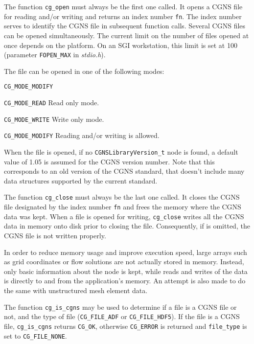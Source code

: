 The function \texttt{cg\_open} must always be the first one called.
It opens a CGNS file for reading and/or writing and returns an index
number \texttt{fn}.
The index number serves to identify the CGNS file in subsequent
function calls.
Several CGNS files can be opened simultaneously.
The current limit on the number of files opened at once depends on the
platform.
On an SGI workstation, this limit is set at 100 (parameter
\texttt{FOPEN\_MAX} in \textit{stdio.h}).

The file can be opened in one of the following modes:

\begin{Ventryic}{\texttt{CG\_MODE\_MODIFY}}
\item [\texttt{CG\_MODE\_READ}]
      Read only mode.
\item [\texttt{CG\_MODE\_WRITE}]
      Write only mode.
\item [\texttt{CG\_MODE\_MODIFY}]
      Reading and/or writing is allowed.
\end{Ventryic}

When the file is opened, if no \texttt{CGNSLibraryVersion\_t} node is
found, a default value of 1.05 is assumed for the CGNS version number.
Note that this corresponds to an old version of the CGNS standard, that
doesn't include many data structures supported by the current standard.

The function \texttt{cg\_close} must always be the last one called.
It closes the CGNS file designated by the index number \texttt{fn} and
frees the memory where the CGNS data was kept.
When a file is opened for writing, \texttt{cg\_close} writes all the
CGNS data in memory onto disk prior to closing the file.
Consequently, if is omitted, the CGNS file is not written properly.

In order to reduce memory usage and improve execution speed,
large arrays such as grid coordinates or flow solutions are not actually
stored in memory.
Instead, only basic information about the node is kept,
while reads and writes of the data is directly to and from the
application's memory. An attempt is also made to do the same with
unstructured mesh element data.

The function \texttt{cg\_is\_cgns} may be used to determine if a file is a 
CGNS file or not, and the type of file (\texttt{CG\_FILE\_ADF} or \texttt{CG\_FILE\_HDF5}). 
If the file is a CGNS file, \texttt{cg\_is\_cgns} returns \texttt{CG\_OK}, 
otherwise \texttt{CG\_ERROR} is returned and \texttt{file\_type} is set to 
\texttt{CG\_FILE\_NONE}. 

